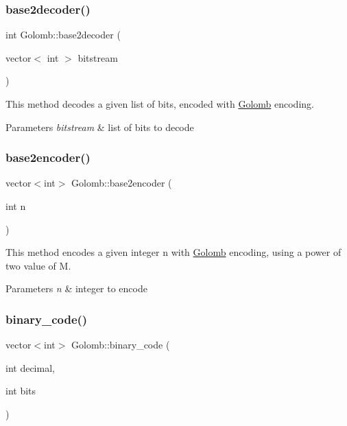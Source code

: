 \subsubsection{\texorpdfstring{base2decoder()}{base2decoder()}}
{\footnotesize\ttfamily int Golomb\+::base2decoder (\begin{DoxyParamCaption}\item[{vector$<$ int $>$}]{bitstream }\end{DoxyParamCaption})\hspace{0.3cm}{\ttfamily [inline]}}

This method decodes a given list of bits, encoded with \hyperlink{classGolomb}{Golomb} encoding.


\begin{DoxyParams}{Parameters}
{\em bitstream} & list of bits to decode \\
\hline
\end{DoxyParams}
\mbox{\label{classGolomb_a91927ef00d074201fba0a176c7e11925}} 
\subsubsection{\texorpdfstring{base2encoder()}{base2encoder()}}
{\footnotesize\ttfamily vector$<$int$>$ Golomb\+::base2encoder (\begin{DoxyParamCaption}\item[{int}]{n }\end{DoxyParamCaption})\hspace{0.3cm}{\ttfamily [inline]}}

This method encodes a given integer \textquotesingle{}n\textquotesingle{} with \hyperlink{classGolomb}{Golomb} encoding, using a power of two value of \textquotesingle{}M\textquotesingle{}.


\begin{DoxyParams}{Parameters}
{\em n} & integer to encode \\
\hline
\end{DoxyParams}
\mbox{\label{classGolomb_a4ce5ce960d0e30505eb5b39e5dc84a6a}} 
\subsubsection{\texorpdfstring{binary\+\_\+code()}{binary\_code()}}
{\footnotesize\ttfamily vector$<$int$>$ Golomb\+::binary\+\_\+code (\begin{DoxyParamCaption}\item[{int}]{decimal,  }\item[{int}]{bits }\end{DoxyParamCaption})\hspace{0.3cm}{\ttfamily [inline]}}

